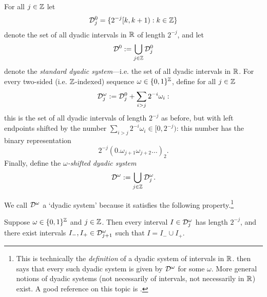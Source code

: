 \begin{defn}
  For all $j \in \mathbb{Z}$ let
  \begin{equation*}
    \mathcal{D}_{j}^{0} = \{2^{-j}[k, k+1) : k \in \mathbb{Z}\}
  \end{equation*}
  denote the set of all dyadic intervals in $\mathbb{R}$ of length $2^{-j}$, and let
  \begin{equation*}
    \mathcal{D}^{0} := \bigcup_{j \in \mathbb{Z}} \mathcal{D}_{j}^{0}
  \end{equation*}
  denote the \emph{standard dyadic system}---i.e. the set of all dyadic intervals in $\mathbb{R}$.
  For every two-sided (i.e. $\mathbb{Z}$-indexed) sequence $\omega \in \{0,1\}^{\mathbb{Z}}$, define for all $j \in \mathbb{Z}$
  \begin{equation*}
    \mathcal{D}_{j}^{\omega} := \mathcal{D}_{j}^{0} + \sum_{i > j} 2^{-i} \omega_{i}:
  \end{equation*}
  this is the set of all dyadic intervals of length $2^{-j}$ as before, but with left endpoints shifted by the number $\sum_{i > j} 2^{-i} \omega_{i} \in [0,2^{-j})$: this number has the binary representation
  \begin{equation*}
    2^{-j}(0.\omega_{j+1}\omega_{j+2}\ldots)_{2} .
  \end{equation*}
  Finally, define the \emph{$\omega$-shifted dyadic system}
  \begin{equation*}
   \mathcal{D}^{\omega} := \bigcup_{j \in \mathbb{Z}} \mathcal{D}_{j}^{\omega}.
  \end{equation*}
\end{defn}

We call $\mathcal{D}^{\omega}$ a `dyadic system' because it satisfies the following property.\footnote{This is technically the \emph{definition} of a dyadic system of intervals in $\mathbb{R}$. \cite[Lemma 5.1.7]{HNVW16} then says that every such dyadic system is given by $\mathcal{D}^\omega$ for some $\omega$. More general notions of dyadic systems (not necessarily of intervals, not necessarily in $\mathbb{R}$) exist. A good reference on this topic is \cite{LN18}.}

\begin{prop}\label{prop:dyadicsystems}
  Suppose $\omega \in \{0,1\}^{\mathbb{Z}}$ and $j \in \mathbb{Z}$.
  Then every interval $I \in \mathcal{D}_{j}^{\omega}$ has length $2^{-j}$, and there exist intervals $I_{-}, I_{+} \in \mathcal{D}^{\omega}_{j+1}$ such that $I = I_{-} \cup I_{+}$.
\end{prop}

